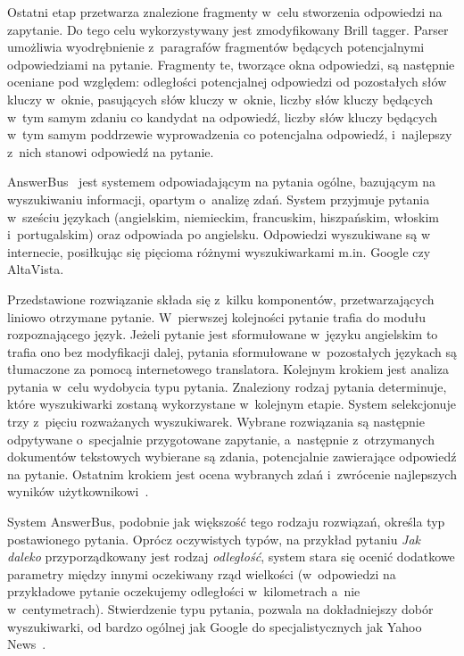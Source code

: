 Ostatni etap przetwarza znalezione fragmenty w~celu stworzenia odpowiedzi na zapytanie. Do tego celu wykorzystywany jest zmodyfikowany Brill tagger. Parser umożliwia wyodrębnienie z~paragrafów fragmentów będących potencjalnymi odpowiedziami na pytanie. Fragmenty te, tworzące okna odpowiedzi, są następnie oceniane pod względem:  odległości potencjalnej odpowiedzi od pozostałych słów kluczy w~oknie, pasujących słów kluczy w~oknie, liczby słów kluczy będących w~tym samym zdaniu co kandydat na odpowiedź, liczby słów kluczy będących w~tym samym poddrzewie wyprowadzenia co potencjalna odpowiedź, i~najlepszy z~nich stanowi odpowiedź na pytanie\cite{moldovan-etal-2000-structure}.

AnswerBus~\cite{zheng2002answerbus} jest systemem odpowiadającym na pytania ogólne, bazującym na wyszukiwaniu informacji, opartym o~analizę zdań. System przyjmuje pytania w~sześciu językach (angielskim, niemieckim, francuskim, hiszpańskim, włoskim i~portugalskim) oraz odpowiada po angielsku. Odpowiedzi wyszukiwane są w~ internecie, posiłkując się pięcioma różnymi wyszukiwarkami m.in. Google czy AltaVista.

Przedstawione rozwiązanie składa się z~kilku komponentów, przetwarzających liniowo otrzymane pytanie. W~pierwszej kolejności pytanie trafia do modułu rozpoznającego język. Jeżeli pytanie jest sformułowane w~języku angielskim to trafia ono bez modyfikacji dalej, pytania sformułowane w~pozostałych językach są tłumaczone za pomocą internetowego translatora. Kolejnym krokiem jest analiza pytania w~celu wydobycia typu pytania. Znaleziony rodzaj pytania determinuje, które wyszukiwarki zostaną wykorzystane w~kolejnym etapie. System selekcjonuje trzy z~pięciu rozważanych wyszukiwarek. Wybrane rozwiązania są następnie odpytywane o~specjalnie przygotowane zapytanie, a~następnie z~otrzymanych dokumentów tekstowych wybierane są zdania, potencjalnie zawierające odpowiedź na pytanie. Ostatnim krokiem jest ocena wybranych zdań i~zwrócenie najlepszych wyników użytkownikowi~\cite{zheng2002answerbus}.  

System AnswerBus, podobnie jak większość tego rodzaju rozwiązań, określa typ postawionego pytania. Oprócz oczywistych typów, na przykład pytaniu \emph{Jak daleko} przyporządkowany jest rodzaj \emph{odległość}, system stara się ocenić dodatkowe parametry między innymi oczekiwany rząd wielkości (w~odpowiedzi na przykładowe pytanie oczekujemy odległości w~kilometrach a~nie w~centymetrach). Stwierdzenie typu pytania, pozwala na dokładniejszy dobór wyszukiwarki, od bardzo ogólnej jak Google do specjalistycznych jak Yahoo News~\cite{zheng2002answerbus}.

